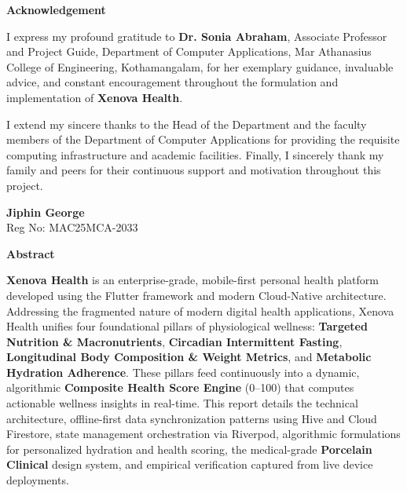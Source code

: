 \documentclass[12pt,a4paper]{article}
\begin{document}

\clearpage

\pagestyle{fancy}

\begin{center}
    \normalfont\fontsize{16}{20}\bfseries Acknowledgement
\end{center}
\vspace{0.4cm}
I express my profound gratitude to \textbf{Dr. Sonia Abraham}, Associate Professor and Project Guide, Department of Computer Applications, Mar Athanasius College of Engineering, Kothamangalam, for her exemplary guidance, invaluable advice, and constant encouragement throughout the formulation and implementation of \textbf{Xenova Health}.

I extend my sincere thanks to the Head of the Department and the faculty members of the Department of Computer Applications for providing the requisite computing infrastructure and academic facilities. Finally, I sincerely thank my family and peers for their continuous support and motivation throughout this project.

\vspace{1.5cm}
\noindent
\textbf{Jiphin George} \\
Reg No: MAC25MCA-2033
\clearpage

\begin{center}
    \normalfont\fontsize{16}{20}\bfseries Abstract
\end{center}
\vspace{0.4cm}
\noindent
\textbf{Xenova Health} is an enterprise-grade, mobile-first personal health platform developed using the Flutter framework and modern Cloud-Native architecture. Addressing the fragmented nature of modern digital health applications, Xenova Health unifies four foundational pillars of physiological wellness: \textbf{Targeted Nutrition \& Macronutrients}, \textbf{Circadian Intermittent Fasting}, \textbf{Longitudinal Body Composition \& Weight Metrics}, and \textbf{Metabolic Hydration Adherence}. These pillars feed continuously into a dynamic, algorithmic \textbf{Composite Health Score Engine} (0--100) that computes actionable wellness insights in real-time. This report details the technical architecture, offline-first data synchronization patterns using Hive and Cloud Firestore, state management orchestration via Riverpod, algorithmic formulations for personalized hydration and health scoring, the medical-grade \textbf{Porcelain Clinical} design system, and empirical verification captured from live device deployments.
\clearpage
\end{document}
